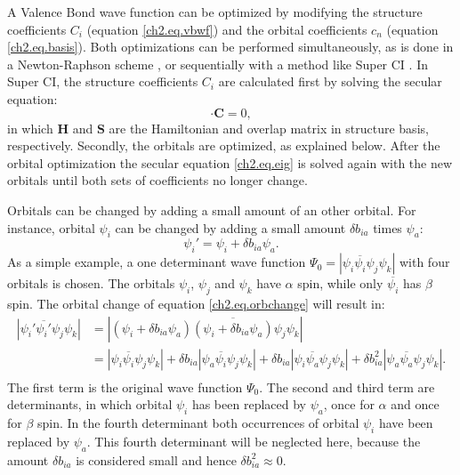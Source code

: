 A Valence Bond wave function can be optimized by modifying the structure coefficients $C_i$ (equation \ref{ch2.eq.vbwf}) and the orbital coefficients $c_n$ (equation \ref{ch2.eq.basis}). Both optimizations can be performed simultaneously, as is done in a Newton-Raphson scheme \cite{zahid}, or sequentially with a method like Super CI \cite{superci1,superci2}. In Super CI, the structure coefficients $C_i$ are calculated first by solving the secular equation:
\begin{equation}
[\mathbf{H}-E\mathbf{S}] \cdot \mathbf{C} = 0,
\label{ch2.eq.eig}
\end{equation}
in which $\mathbf{H}$ and $\mathbf{S}$ are the Hamiltonian and overlap matrix in structure basis, respectively. Secondly, the orbitals are optimized, as explained below. After the orbital optimization the secular equation \ref{ch2.eq.eig} is solved again with the new orbitals until both sets of coefficients no longer change.

Orbitals can be changed by adding a small amount of an other orbital. For instance, orbital $\psi_i$ can be changed by adding a small amount $\delta b_{ia}$ times $\psi_a$:
\begin{equation}
\psi_i' = \psi_i + \delta b_{ia} \psi_a.
\label{ch2.eq.orbchange}
\end{equation}
As a simple example, a one determinant wave function $\Psi_0=|\psi_i\overline{\psi_i}\psi_j\psi_k|$ with four orbitals is chosen. The orbitals $\psi_i$, $\psi_j$ and $\psi_k$ have $\alpha$ spin, while only $\overline{\psi_i}$ has $\beta$ spin. The orbital change of equation \ref{ch2.eq.orbchange} will result in:
\begin{equation}    
\begin{split}
|\psi_i'\overline{\psi_i'}\psi_j\psi_k | & = |(\psi_i + \delta b_{ia} \psi_a)\overline{(\psi_i + \delta b_{ia}\psi_a)}\psi_j\psi_k |\\
& = |\psi_i\overline{\psi_i}\psi_j\psi_k| + \delta b_{ia}|\psi_a\overline{\psi_i}\psi_j\psi_k| + \delta b_{ia} |\psi_i\overline{\psi_a}\psi_j\psi_k| + \delta b^2_{ia} |\psi_a\overline{\psi_a}\psi_j\psi_k|.\\
\end{split}
\label{ch2.eq.detchange}
\end{equation}
The first term is the original wave function $\Psi_0$. The second and third term are determinants, in which orbital $\psi_i$ has been replaced by $\psi_a$, once for $\alpha$ and once for $\beta$ spin. In the fourth determinant both occurrences of orbital $\psi_i$ have been replaced by $\psi_a$. This fourth determinant will be neglected here, because the amount $\delta b_{ia}$ is considered small and hence $\delta b_{ia}^2 \approx 0$.

